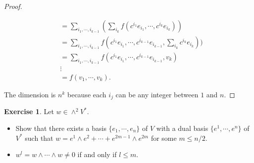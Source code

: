 \documentclass[12pt, psamsfonts]{amsart}
\theoremstyle{definition}
\newtheorem{exer}[thm]{Exercise}
\theoremstyle{remark}
\numberwithin{equation}{section}
\begin{document}
\begin{proof}
\begin{itemize}
\begin{align*}
          &= \sum_{i_1, \cdots, i_{k - 1}} (\sum_{i_k} f(c^{i_1}e_{i_1}, \cdots, c^{i_k}e_{i_k})) \\
          &= \sum_{i_1, \cdots, i_{k - 1}} f(c^{i_1}e_{i_1}, \cdots, c^{i_{k - 1}}e_{i_{k - 1}}, \sum_{i_k} c^{i_k}e_{i_k})) \\
          &= \sum_{i_1, \cdots, i_{k - 1}} f(c^{i_1}e_{i_1}, \cdots, c^{i_{k - 1}}e_{i_{k - 1}}, v_k) \\
          &  \vdots \\
          &= f(v_1, \cdots, v_k).
      \end{align*}
  \end{itemize}
  The dimension is $n^k$ because each $i_j$ can be any integer between $1$ and $n$.
\end{proof}

\begin{exer}
  Let $w \in \wedge^2 V^*$.
  \begin{itemize}
    \item
      Show that there exists a basis $\{ e_1, \cdots, e_n \}$ of $V$ with a dual basis $\{ e^1, \cdots, e^n \}$ of $V^*$ such that $w = e^1 \wedge e^2 + \cdots + e^{2m - 1} \wedge e^{2m}$ for some $m \leq n / 2$.
    \item
      $w^l = w \wedge \cdots \wedge w \ne 0$ if and only if $l \leq m$.
  \end{itemize}
\end{exer}
\end{document}
